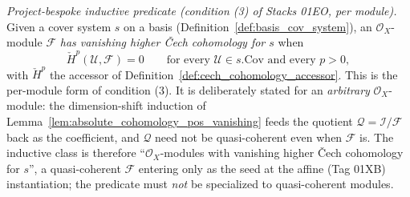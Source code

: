 \begin{definition}\leanok
  \label{def:has_vanishing_higher_cech}
  \textit{Project-bespoke inductive predicate (condition (3) of Stacks 01EO, per module).}
  Given a cover system \(s\) on a basis (Definition~\ref{def:basis_cov_system}), an
  \(\mathcal{O}_X\)-module \(\mathcal{F}\) \emph{has vanishing higher {\v C}ech cohomology for
  \(s\)} when
  \[
    \check{H}^p(\mathcal{U}, \mathcal{F}) = 0 \qquad
      \text{for every } \mathcal{U} \in s.\mathrm{Cov} \text{ and every } p > 0,
  \]
  with \(\check{H}^p\) the accessor of Definition~\ref{def:cech_cohomology_accessor}. This is the
  per-module form of condition (3). It is deliberately stated for an \emph{arbitrary}
  \(\mathcal{O}_X\)-module: the dimension-shift induction of
  Lemma~\ref{lem:absolute_cohomology_pos_vanishing} feeds the quotient \(\mathcal{Q} =
  \mathcal{I}/\mathcal{F}\) back as the coefficient, and \(\mathcal{Q}\) need not be quasi-coherent
  even when \(\mathcal{F}\) is. The inductive class is therefore ``\(\mathcal{O}_X\)-modules with
  vanishing higher {\v C}ech cohomology for \(s\)'', a quasi-coherent \(\mathcal{F}\) entering only
  as the seed at the affine (Tag 01XB) instantiation; the predicate must \emph{not} be specialized
  to quasi-coherent modules.
\end{definition}

